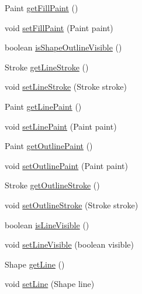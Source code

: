 \begin{DoxyCompactItemize}
\item 
Paint \mbox{\hyperlink{classorg_1_1jfree_1_1chart_1_1_legend_item_a409022aa47bddad9a8d58a6ed8045b71}{get\+Fill\+Paint}} ()
\item 
void \mbox{\hyperlink{classorg_1_1jfree_1_1chart_1_1_legend_item_a8c3428a5e7e08be6abf1b4ac4de5e59a}{set\+Fill\+Paint}} (Paint paint)
\item 
boolean \mbox{\hyperlink{classorg_1_1jfree_1_1chart_1_1_legend_item_a0c35eff4db49fba7e35a4f114dc7afd3}{is\+Shape\+Outline\+Visible}} ()
\item 
Stroke \mbox{\hyperlink{classorg_1_1jfree_1_1chart_1_1_legend_item_aff1ed219900d9fe6fbda3ff27c1dc8ec}{get\+Line\+Stroke}} ()
\item 
void \mbox{\hyperlink{classorg_1_1jfree_1_1chart_1_1_legend_item_acee02a872194bdf70fd87d852caba2de}{set\+Line\+Stroke}} (Stroke stroke)
\item 
Paint \mbox{\hyperlink{classorg_1_1jfree_1_1chart_1_1_legend_item_a5a51f44acf1e7038aa34db01a725b42d}{get\+Line\+Paint}} ()
\item 
void \mbox{\hyperlink{classorg_1_1jfree_1_1chart_1_1_legend_item_a6ab5955a7f911e86d4f1879d4254a57f}{set\+Line\+Paint}} (Paint paint)
\item 
Paint \mbox{\hyperlink{classorg_1_1jfree_1_1chart_1_1_legend_item_a78096551a5c33e695c3c7905ec6d4631}{get\+Outline\+Paint}} ()
\item 
void \mbox{\hyperlink{classorg_1_1jfree_1_1chart_1_1_legend_item_a6077fa4d19eaa39e0b688c74bd25c468}{set\+Outline\+Paint}} (Paint paint)
\item 
Stroke \mbox{\hyperlink{classorg_1_1jfree_1_1chart_1_1_legend_item_a9fd24f701026a5ea52ce85f5e358e877}{get\+Outline\+Stroke}} ()
\item 
void \mbox{\hyperlink{classorg_1_1jfree_1_1chart_1_1_legend_item_a3a376b04acc776e2973de9f737713239}{set\+Outline\+Stroke}} (Stroke stroke)
\item 
boolean \mbox{\hyperlink{classorg_1_1jfree_1_1chart_1_1_legend_item_af99c8d8cee770e72ecddaf3b2cf467b1}{is\+Line\+Visible}} ()
\item 
void \mbox{\hyperlink{classorg_1_1jfree_1_1chart_1_1_legend_item_abcb71ba1ad07cc2d43b0528b50217464}{set\+Line\+Visible}} (boolean visible)
\item 
Shape \mbox{\hyperlink{classorg_1_1jfree_1_1chart_1_1_legend_item_a26acef94552140dba2705f7a859d797c}{get\+Line}} ()
\item 
void \mbox{\hyperlink{classorg_1_1jfree_1_1chart_1_1_legend_item_ac1f02a45ce3660d16dba77a970f28f44}{set\+Line}} (Shape line)

\end{DoxyCompactItemize}
